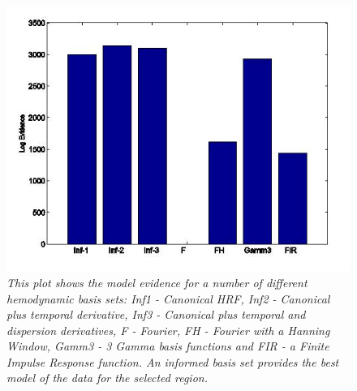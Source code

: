 \documentclass[a4paper,titlepage]{book}
\begin{document}
\begin{figure}
\includegraphics[width=150mm]{basis}
\caption{\em This plot shows the model evidence for a number 
of different hemodynamic basis sets: Inf1 - Canonical HRF, Inf2 - Canonical plus temporal derivative, Inf3 - Canonical plus 
temporal and dispersion derivatives, F - Fourier, FH - Fourier 
with a Hanning Window, Gamm3 - 3 Gamma basis functions and FIR - 
a Finite Impulse Response function. An informed basis set provides 
the best model of the data for the selected region.  \label{basis}}
\end{figure}




\end{document}

